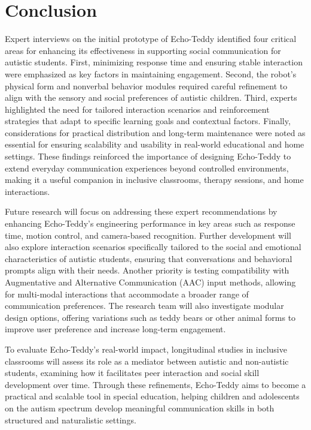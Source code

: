 \section{Conclusion}

Expert interviews on the initial prototype of Echo-Teddy identified four critical areas for enhancing its effectiveness in supporting social communication for autistic students. First, minimizing response time and ensuring stable interaction were emphasized as key factors in maintaining engagement. Second, the robot’s physical form and nonverbal behavior modules required careful refinement to align with the sensory and social preferences of autistic children. Third, experts highlighted the need for tailored interaction scenarios and reinforcement strategies that adapt to specific learning goals and contextual factors. Finally, considerations for practical distribution and long-term maintenance were noted as essential for ensuring scalability and usability in real-world educational and home settings. These findings reinforced the importance of designing Echo-Teddy to extend everyday communication experiences beyond controlled environments, making it a useful companion in inclusive classrooms, therapy sessions, and home interactions.

Future research will focus on addressing these expert recommendations by enhancing Echo-Teddy’s engineering performance in key areas such as response time, motion control, and camera-based recognition. Further development will also explore interaction scenarios specifically tailored to the social and emotional characteristics of autistic students, ensuring that conversations and behavioral prompts align with their needs. Another priority is testing compatibility with Augmentative and Alternative Communication (AAC) input methods, allowing for multi-modal interactions that accommodate a broader range of communication preferences. The research team will also investigate modular design options, offering variations such as teddy bears or other animal forms to improve user preference and increase long-term engagement.

To evaluate Echo-Teddy’s real-world impact, longitudinal studies in inclusive classrooms will assess its role as a mediator between autistic and non-autistic students, examining how it facilitates peer interaction and social skill development over time. Through these refinements, Echo-Teddy aims to become a practical and scalable tool in special education, helping children and adolescents on the autism spectrum develop meaningful communication skills in both structured and naturalistic settings.